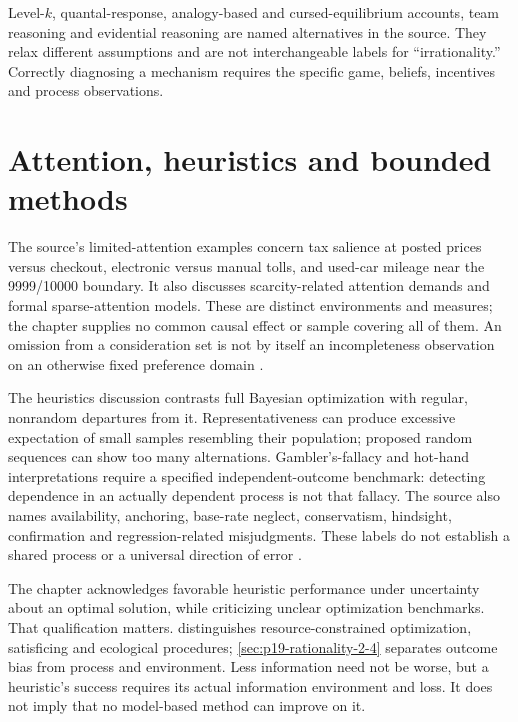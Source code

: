 Level-\(k\), quantal-response, analogy-based and cursed-equilibrium accounts,
team reasoning and evidential reasoning are named alternatives in the
source. They relax different assumptions and are not interchangeable labels
for ``irrationality.'' Correctly diagnosing a mechanism requires the specific
game, beliefs, incentives and process observations.

\section{Attention, heuristics and bounded methods}
\label{sec:p19-r94-bounded}

The source's limited-attention examples concern tax salience at posted
prices versus checkout, electronic versus manual tolls, and used-car mileage
near the 9999/10000 boundary. It also discusses scarcity-related attention
demands and formal sparse-attention models. These are distinct environments
and measures; the chapter supplies no common causal effect or sample
covering all of them. An omission from a consideration set is not by itself
an incompleteness observation on an otherwise fixed preference domain
\cite[p.~570]{DhamiAlNowaihi2021Economics}.

The heuristics discussion contrasts full Bayesian optimization with regular,
nonrandom departures from it. Representativeness can produce excessive
expectation of small samples resembling their population; proposed random
sequences can show too many alternations. Gambler's-fallacy and hot-hand
interpretations require a specified independent-outcome benchmark: detecting
dependence in an actually dependent process is not that fallacy. The source
also names availability, anchoring, base-rate neglect, conservatism,
hindsight, confirmation and regression-related misjudgments. These labels
do not establish a shared process or a universal direction of error
\cite[pp.~572--573, notes~8--9]{DhamiAlNowaihi2021Economics}.

The chapter acknowledges favorable heuristic performance under uncertainty
about an optimal solution, while criticizing unclear optimization benchmarks.
That qualification matters.  distinguishes
resource-constrained optimization, satisficing and ecological procedures;
\cref{sec:p19-rationality-2-4} separates outcome bias from process and
environment. Less information need not be worse, but a heuristic's success
requires its actual information environment and loss. It does not imply
that no model-based method can improve on it.

